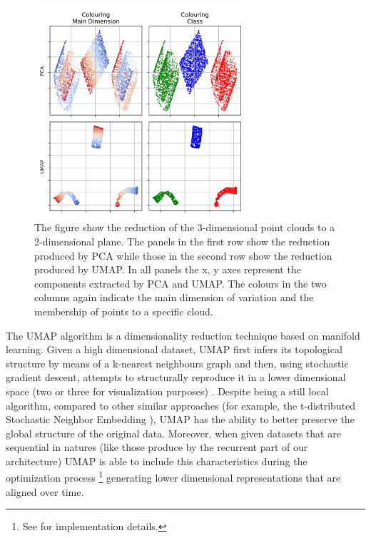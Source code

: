\label{dim_reduction}
\begin{figure}[h]
  \centering
  \includegraphics[width=0.7\textwidth]{images/chapter_4/reduced.png}
    \caption[\textbf{PCA and UMAP reduction of Swiss roll and square}]{The figure show the reduction of the 3-dimensional point clouds to a 2-dimensional plane. The panels in the first row show the reduction produced by PCA while those in the second row show the reduction produced by UMAP. In all panels the x, y axes represent the components extracted by PCA and UMAP. The colours in the two columns again indicate the main dimension of variation and the membership of points to a specific cloud.}
    \label{fig: swiss_reduce}
\end{figure}

The UMAP algorithm is a dimensionality reduction technique based on manifold learning. Given a high dimensional dataset, UMAP first infers its topological structure by means of a k-nearest neighbours graph and then, using stochastic gradient descent, attempts to structurally reproduce it in a lower dimensional space (two or three for visualization purposes) \cite{2018arXivUMAP}. Despite being a still local algorithm, compared to other similar approaches (for example, the t-distributed Stochastic Neighbor Embedding \cite{van2008visualizing}),  UMAP has the ability to better preserve the global structure of the original data. Moreover, when given datasets that are sequential in natures (like those produce by the recurrent part of our architecture) UMAP is able to include this characteristics during the optimization process \footnote{See \cite{alignedumap} for implementation details.} generating lower dimensional representations that are aligned over time. 

